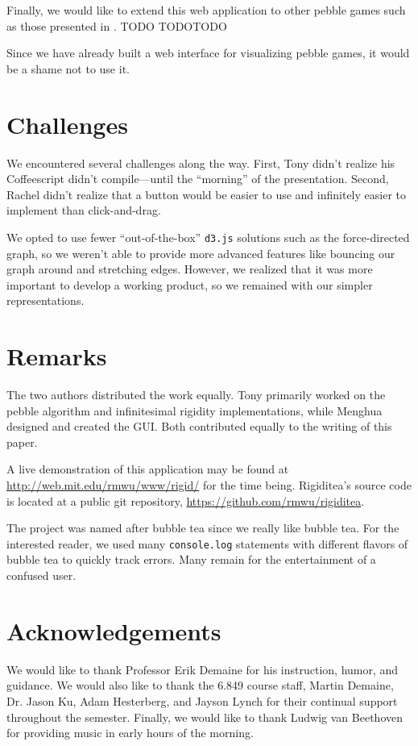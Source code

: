 \documentclass[aps,prd,final,twocolumn,letterpaper,nofootinbib]{revtex4-1}
\begin{document}
Finally, we would like to extend this web application to other pebble games
such as those presented in \cite{lee08, chubynsky07}.
TODO TODOTODO

Since we have already built a web interface for visualizing pebble games,
it would be a shame not to use it.

\section*{Challenges}

We encountered several challenges along the way.
First, Tony didn't realize his Coffeescript didn't compile---until the ``morning''
of the presentation.
Second, Rachel didn't realize that a button would be easier to use
and infinitely easier to implement than click-and-drag.

We opted to use fewer ``out-of-the-box'' \texttt{d3.js} solutions such as
the force-directed graph, so we weren't able to provide more advanced features
like bouncing our graph around and stretching edges.
However, we realized that it was more important to develop a working product,
so we remained with our simpler representations.

\section*{Remarks}

The two authors distributed the work equally.
Tony primarily worked on the pebble algorithm and infinitesimal rigidity implementations,
while Menghua designed and created the GUI.
Both contributed equally to the writing of this paper.

A live demonstration of this application may be found at
\url{http://web.mit.edu/rmwu/www/rigid/} for the time being.
Rigiditea's source code is located at a public git repository,
\url{https://github.com/rmwu/rigiditea}.

The project was named after bubble tea since we really like bubble tea.
For the interested reader, we used many \texttt{console.log} statements
with different flavors of bubble tea to quickly track errors.
Many remain for the entertainment of a confused user.

\section*{Acknowledgements}

We would like to thank Professor Erik Demaine for his instruction,
humor, and guidance. We would also like to thank the 6.849 course staff,
Martin Demaine, Dr. Jason Ku, Adam Hesterberg, and Jayson Lynch
for their continual support throughout the semester.
Finally, we would like to thank Ludwig van Beethoven for providing
music in early hours of the morning.

{}

\end{document}
